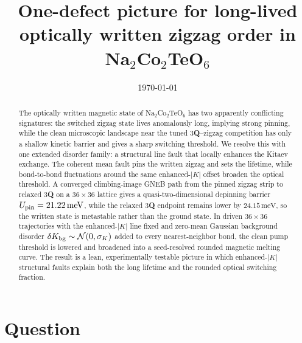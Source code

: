 \documentclass[aps,prb,twocolumn,superscriptaddress,floatfix,nofootinbib]{revtex4-2}
\newcommand{\NCTO}{Na$_2$Co$_2$TeO$_6$}
\newcommand{\threeQ}{3\textbf{Q}}
\newcommand{\meV}{\,\mathrm{meV}}
\begin{document}
\title{One-defect picture for long-lived optically written zigzag order in \NCTO}

\author{}
\affiliation{}

\date{\today}

\begin{abstract}
The optically written magnetic state of \NCTO{} has two apparently conflicting
signatures: the switched zigzag state lives anomalously long, implying strong
pinning, while the clean microscopic landscape near the tuned \threeQ--zigzag
competition has only a shallow kinetic barrier and gives a sharp switching
threshold.  We resolve this with one extended disorder family: a structural line
fault that locally enhances the Kitaev exchange.  The coherent mean fault pins
the written zigzag and sets the lifetime, while bond-to-bond fluctuations around
the same enhanced-$|K|$ offset broaden the optical threshold.  A converged
climbing-image GNEB path from
the pinned zigzag strip to relaxed \threeQ{} on a $36\times36$ lattice gives a
quasi-two-dimensional depinning barrier $U_{\rm pin}=21.22\meV$, while the relaxed
\threeQ{} endpoint remains lower by $24.15\meV$, so the written state is
metastable rather than the ground state.  In driven $36\times36$ trajectories with the enhanced-$|K|$ line fixed
and zero-mean Gaussian background disorder $\delta K_{\rm bg}\sim\mathcal N(0,\sigma_K)$
added to every nearest-neighbor bond, the clean pump threshold is lowered and
broadened into a seed-resolved rounded magnetic melting curve.  The result is a lean, experimentally
testable picture in which enhanced-$|K|$ structural faults explain both the long
lifetime and the rounded optical switching fraction.
\end{abstract}

\maketitle

\section{Question}
\end{document}
